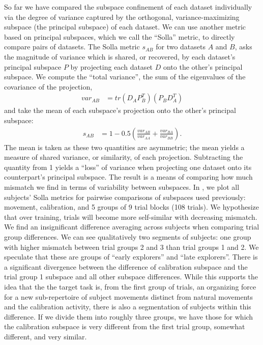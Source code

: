 \documentclass[../main.tex]{subfiles}
\begin{document}
So far we have compared the subspace confinement of each dataset individually via the degree of variance captured by the orthogonal, variance-maximizing subspace (the principal subspace) of each dataset. We can use another metric based on principal subspaces, which we call the ``Solla'' metric, to directly compare pairs of datasets\cite{yanUnexpectedComplexityEveryday2020}. The Solla metric $s_{AB}$ for two datasets $A$ and $B$, asks the magnitude of variance which is shared, or recovered, by each dataset's principal subspace $P$ by projecting each dataset $D$ onto the other's principal subspace. We compute the ``total variance'', the sum of the eigenvalues of the covariance of the projection,
%
\begin{align}
  var_{AB} &= tr{(D_AP_B^T)(P_BD_A^T)}
\end{align}
%
and take the mean of each subspace's projection onto the other's principal subspace:
%
\begin{align}
  s_{AB} &= 1 - 0.5\left( \frac{var_{AB}}{var_{AA}} + \frac{var_{BA}}{var_{BB}} \right).
\end{align}
%
The mean is taken as these two quantities are asymmetric; the mean yields a measure of shared variance, or similarity, of each projection. Subtracting the quantity from 1 yields a ``loss'' of variance when projecting one dataset onto its counterpart's principal subspace. The result is a means of comparing how much mismatch we find in terms of variability between subspaces. In , we plot all subjects' Solla metrics for pairwise comparisons of subspaces used previously: movement, calibration, and 5 groups of 9 trial blocks (108 trials). We hypothesize that over training, trials will become more self-similar with decreasing mismatch. We find an insignificant difference averaging across subjects when comparing trial group differences. We can see qualitatively two segments of subjects: one group with higher mismatch between trial groups 2 and 3 than trial groups 1 and 2. We speculate that these are groups of ``early explorers'' and ``late explorers''. There is a significant divergence between the difference of calibration subspace and the trial group 1 subspace and all other subspace differences. While this supports the idea that the the target task is, from the first group of trials, an organizing force for a new sub-repertoire of subject movements distinct from natural movements and the calibration activity, there is also a segmentation of subjects within this difference. If we divide them into roughly three groups, we have those for which the calibration subspace is very different from the first trial group, somewhat different, and very similar. 
\end{document}
